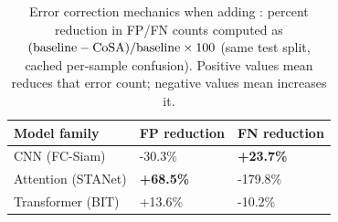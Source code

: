 \begin{table}[t]
  \centering
  \caption{Error correction mechanics when adding \cosa{}: percent reduction in FP/FN counts computed as $(\mathrm{baseline}-\mathrm{CoSA{}})/\mathrm{baseline}\times100$ (same test split, cached per-sample confusion). Positive values mean \cosa{} reduces that error count; negative values mean \cosa{} increases it.}
  \label{tab:error_mechanics}
  \setlength{\tabcolsep}{4pt}
  \renewcommand{\arraystretch}{1.05}
  \begin{tabular}{l l l}
    \toprule
    Model family & FP reduction & FN reduction \\
    \midrule
    CNN (FC-Siam) & -30.3\% & \textbf{+23.7\%} \\
    Attention (STANet) & \textbf{+68.5\%} & -179.8\% \\
    Transformer (BIT) & +13.6\% & -10.2\% \\
    \bottomrule
  \end{tabular}
\end{table}

